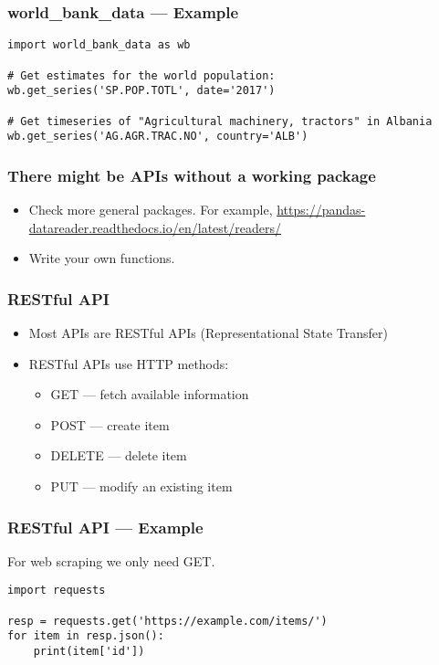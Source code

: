 \begin{frame}[fragile]
    \frametitle{world\_bank\_data --- Example}
\begin{verbatim}
import world_bank_data as wb

# Get estimates for the world population:
wb.get_series('SP.POP.TOTL', date='2017')

# Get timeseries of "Agricultural machinery, tractors" in Albania
wb.get_series('AG.AGR.TRAC.NO', country='ALB')
\end{verbatim}
\end{frame}

\begin{frame}
    \frametitle{There might be APIs without a working package}
    \begin{itemize}
        \item Check more general packages. For example, \href{https://pandas-datareader.readthedocs.io/en/latest/readers/}{https://pandas-datareader.readthedocs.io/en/latest/readers/}
        \item Write your own functions.
    \end{itemize}
\end{frame}

\begin{frame}
    \frametitle{RESTful API}
    \begin{itemize}
        \item Most APIs are RESTful APIs (Representational State Transfer)
        \item RESTful APIs use HTTP methods:
        \begin{itemize}
            \item GET --- fetch available information
            \item POST --- create item
            \item DELETE --- delete item
            \item PUT --- modify an existing item
        \end{itemize}
    \end{itemize}
\end{frame}

\begin{frame}[fragile]
    \frametitle{RESTful API --- Example}

    For web scraping we only need GET.

\begin{verbatim}
import requests

resp = requests.get('https://example.com/items/')
for item in resp.json():
    print(item['id'])
\end{verbatim}
\end{frame}